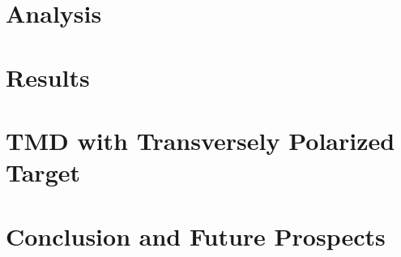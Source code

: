 \documentclass{uiucthesis2021}
\begin{document}
\chapter{Analysis}


\chapter{Results}


\chapter{TMD with Transversely Polarized Target}



% 
% 
% 
% 

\chapter{Conclusion and Future Prospects}



\backmatter

\printbibliography[heading=bibintoc,title={References}]
\end{document}
